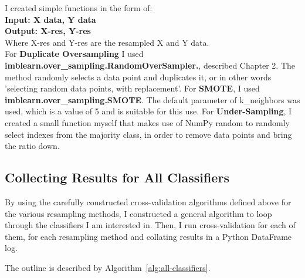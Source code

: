 \documentclass[12pt,a4paper,twoside]{report}
\begin{document}
I created simple functions in the form of:\\
\textbf{Input: X data, Y data}\\
\textbf{Output: X-res, Y-res}\\
Where X-res and Y-res are the resampled X and Y data. \\

For \textbf{Duplicate Oversampling} I used \textbf{imblearn.over\_sampling.RandomOverSampler.}, described Chapter 2. The method randomly selects a data point and duplicates it, or in other words 'selecting random data points, with replacement'.
For \textbf{SMOTE}, I used \textbf{imblearn.over\_sampling.SMOTE}. The default parameter of k\_neighbors was used, which is a value of 5 and is suitable for this use. 
For \textbf{Under-Sampling}, I created a small function myself that makes use of NumPy random to randomly select indexes from the majority class, in order to remove data points and bring the ratio down.

\subsection{Collecting Results for All Classifiers}
By using the carefully constructed cross-validation algorithms defined above for the various resampling methods, I constructed a general algorithm to loop through the classifiers I am interested in. Then, I run cross-validation for each of them, for each resampling method and collating results in a Python DataFrame log. 

The outline is described by Algorithm~\ref{alg:all-classifiers}.
\end{document}
